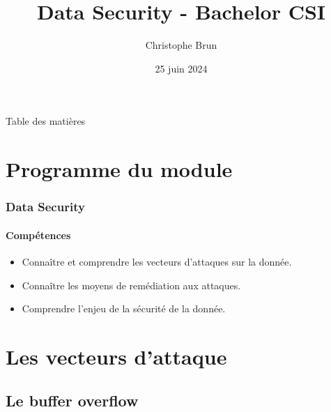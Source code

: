 \documentclass{beamer}
\title{Data Security - Bachelor CSI}
\author{Christophe Brun}
\institute{Campus Saint-Michel IT}
\date{25 juin 2024}
\begin{document}
    \begin{frame}
        \transdissolve
        \titlepage
    \end{frame}

    \begin{frame}{Table des matières}
        \tableofcontents
    \end{frame}


    \section{Programme du module}\label{sec:programme-du-module}
    \begin{frame}
        \frametitle{Data Security}
        \framesubtitle{Compétences}
        \transdissolve
        \begin{itemize}
            \item Connaître et comprendre les vecteurs d'attaques sur la donnée.
            \item Connaître les moyens de remédiation aux attaques.
            \item Comprendre l'enjeu de la sécurité de la donnée.
        \end{itemize}
    \end{frame}


    \section{Les vecteurs d'attaque}\label{sec:les-vecteurs-dattaque}

    \subsection{Le buffer overflow}\label{subsec:les-buffer-overflow}
\end{document}
